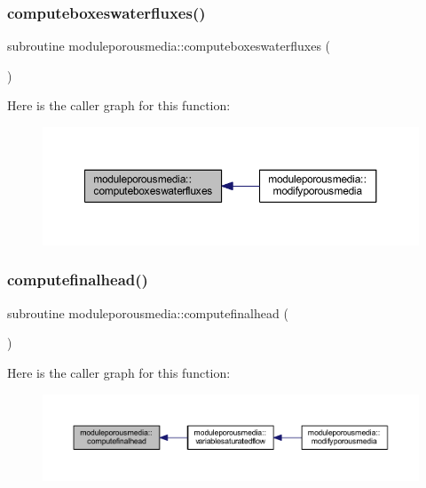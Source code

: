 \subsubsection{\texorpdfstring{computeboxeswaterfluxes()}{computeboxeswaterfluxes()}}
{\footnotesize\ttfamily subroutine moduleporousmedia\+::computeboxeswaterfluxes (\begin{DoxyParamCaption}{ }\end{DoxyParamCaption})\hspace{0.3cm}{\ttfamily [private]}}

Here is the caller graph for this function\+:\nopagebreak
\begin{figure}[H]
\begin{center}
\leavevmode
\includegraphics[width=350pt]{namespacemoduleporousmedia_ae3a3e980159413f4ef5a35c8b4763aa6_icgraph}
\end{center}
\end{figure}
\mbox{\label{namespacemoduleporousmedia_ab6c499954f98c7268ff499c927952622}} 
\subsubsection{\texorpdfstring{computefinalhead()}{computefinalhead()}}
{\footnotesize\ttfamily subroutine moduleporousmedia\+::computefinalhead (\begin{DoxyParamCaption}{ }\end{DoxyParamCaption})\hspace{0.3cm}{\ttfamily [private]}}

Here is the caller graph for this function\+:\nopagebreak
\begin{figure}[H]
\begin{center}
\leavevmode
\includegraphics[width=350pt]{namespacemoduleporousmedia_ab6c499954f98c7268ff499c927952622_icgraph}
\end{center}
\end{figure}
\mbox{\label{namespacemoduleporousmedia_a7f0fec21916c2f7aad9c56e3af1c8cae}} 
